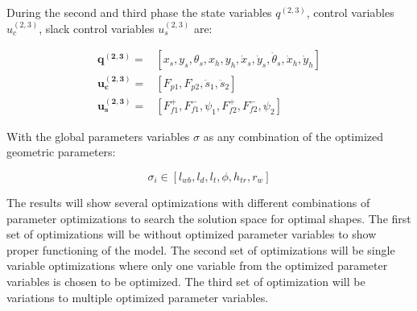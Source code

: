 \documentclass[default,iicol]{sn-jnl}
\theoremstyle{thmstyleone}%
\theoremstyle{thmstyletwo}%
\theoremstyle{thmstylethree}%
\begin{document}
During the second and third phase the state variables $q^{(2,3)}$, control variables $u_c^{(2,3)}$, slack control variables $u_s^{(2,3)}$ are:

\begin{equation}
\begin{array}{rl}
   \mathbf{q^{(2,3)}} =& [x_s, y_s, \theta_s, x_h, y_h, \dot x_s, \dot y_s, \dot \theta_s,\dot x_h, \dot y_h]    \\
   \mathbf{u_c^{(2,3)}} =& [F_{p1}, F_{p2}, \ddot s_1, \ddot s_2]  \\
   \mathbf{u_s^{(2,3)}}=&  [F_{f1}^+, F_{f1}^-, \psi_1,F_{f2}^+, F_{f2}^-, \psi_2] 
\end{array}
\end{equation}

With the global parameters variables $\sigma$ as any combination of the optimized geometric parameters: 

\begin{equation}
    \sigma_i \in [l_{wb}, l_d, l_t, \phi, h_{tr}, r_w]
\end{equation}

The results will show several optimizations with different combinations of parameter optimizations to search the solution space for optimal shapes. The first set of optimizations will be without optimized parameter variables to show proper functioning of the model. The second set of optimizations will be single variable optimizations where only one variable from the optimized parameter variables is chosen to be optimized. The third set of optimization will be variations to multiple optimized parameter variables. 





\pagestyle{plain}
%
%
\end{document}
